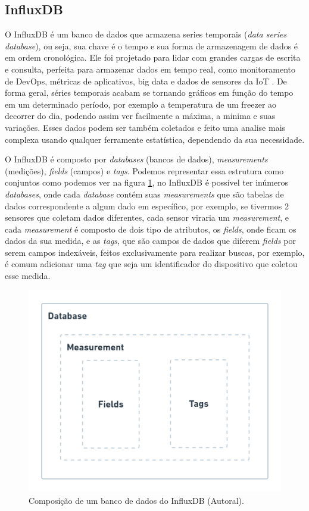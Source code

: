 
\subsection{InfluxDB}
\label{fund:influxdb}
O InfluxDB é um banco de dados que armazena series temporais (\textit{data series database}), ou seja, sua chave é o tempo e sua forma de armazenagem de dados é em ordem cronológica. Ele foi projetado para lidar com grandes cargas de escrita e consulta, perfeita para armazenar dados em tempo real, como monitoramento de DevOps, métricas de aplicativos, big data e dados de sensores da IoT \cite{giacobbe2018implementation}. De forma geral, séries temporais acabam se tornando gráficos em função do tempo em um determinado período, por exemplo a temperatura de um freezer ao decorrer do dia, podendo assim ver facilmente a máxima, a minima e suas variações. Esses dados podem ser também coletados e feito uma analise mais complexa usando qualquer ferramente estatística, dependendo da sua necessidade.

O InfluxDB é composto por \textit{databases} (bancos de dados), \textit{measurements} (medições), \textit{fields} (campos) e \textit{tags}. Podemos representar essa estrutura como conjuntos como podemos ver na figura \ref{fig:influxdb-struct}, no InfluxDB é possível ter inúmeros \textit{databases}, onde cada \textit{database} contém suas \textit{measurements} que são tabelas de dados correspondente a algum dado em específico, por exemplo, se tivermos 2 sensores que coletam dados diferentes, cada sensor viraria um \textit{measurement}, e cada \textit{measurement} é composto  de dois tipo de atributos, os \textit{fields}, onde ficam os dados da sua medida, e as \textit{tags}, que são campos de dados que diferem \textit{fields} por serem campos indexáveis, feitos exclusivamente para realizar buscas, por exemplo, é comum adicionar uma \textit{tag} que seja um identificador do dispositivo que coletou esse medida.

\begin{figure}[H]
  \centering
  \includegraphics[width=.80\textwidth]{assets/influxdb-struct.png} 
  \caption{Composição de um banco de dados do InfluxDB (Autoral).}
  \label{fig:influxdb-struct} 
\end{figure}

